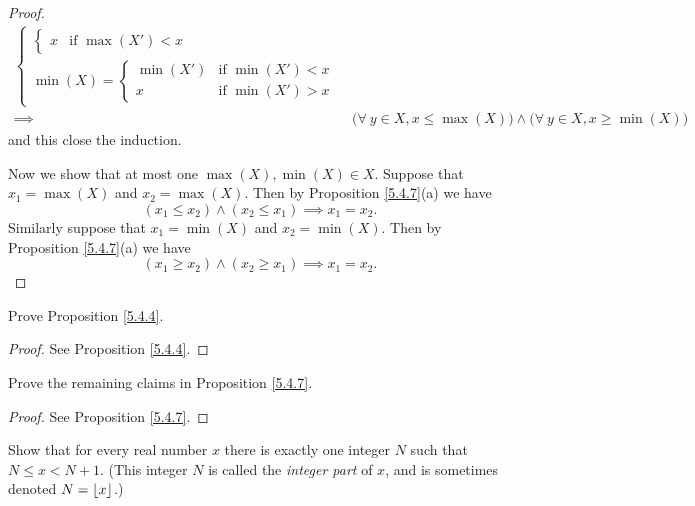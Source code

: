 \begin{proof}
\begin{align*}
\begin{cases}
\begin{cases}
                x        & \text{if } \max(X') < x
            \end{cases} \\
            \min(X) = \begin{cases}
                \min(X') & \text{if } \min(X') < x \\
                x        & \text{if } \min(X') > x
            \end{cases}
        \end{cases}                                                                                                            \\
        \implies & \big(\forall\ y \in X, x \leq \max(X)\big) \land \big(\forall\ y \in X, x \geq \min(X)\big)
    \end{align*}
    and this close the induction.

    Now we show that at most one \(\max(X), \min(X) \in X\).
    Suppose that \(x_1 = \max(X)\) and \(x_2 = \max(X)\).
    Then by Proposition \ref{5.4.7}(a) we have
    \[
        (x_1 \leq x_2) \land (x_2 \leq x_1) \implies x_1 = x_2.
    \]
    Similarly suppose that \(x_1 = \min(X)\) and \(x_2 = \min(X)\).
    Then by Proposition \ref{5.4.7}(a) we have
    \[
        (x_1 \geq x_2) \land (x_2 \geq x_1) \implies x_1 = x_2.
    \]
\end{proof}

\exercisesection

\begin{exercise}\label{ex 5.4.1}
    Prove Proposition \ref{5.4.4}.
\end{exercise}

\begin{proof}
    See Proposition \ref{5.4.4}.
\end{proof}

\begin{exercise}\label{ex 5.4.2}
    Prove the remaining claims in Proposition \ref{5.4.7}.
\end{exercise}

\begin{proof}
    See Proposition \ref{5.4.7}.
\end{proof}

\begin{exercise}\label{ex 5.4.3}
    Show that for every real number \(x\) there is exactly one integer \(N\) such that \(N \leq x < N + 1\).
    (This integer \(N\) is called the \emph{integer part} of \(x\), and is sometimes denoted \(N = \floor*{x}\).)
\end{exercise}

